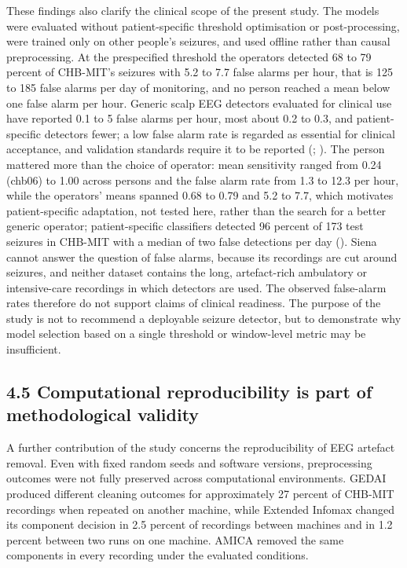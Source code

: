 \documentclass[11pt,a4paper]{article}
\begin{document}
These findings also clarify the clinical scope of the present study. The models were
evaluated without patient-specific threshold optimisation or post-processing, were
trained only on other people's seizures, and used offline rather than causal
preprocessing. At the prespecified threshold the operators detected 68 to 79 percent of
CHB-MIT's seizures with 5.2 to 7.7 false alarms per hour, that is 125 to 185 false alarms
per day of monitoring, and no person reached a mean below one false alarm per hour.
Generic scalp EEG detectors evaluated for clinical use have reported 0.1 to 5 false alarms
per hour, most about 0.2 to 0.3, and patient-specific detectors fewer; a low false alarm
rate is regarded as essential for clinical acceptance, and validation standards require
it to be reported (\citealp{Baumgartner_2018}; \citealp{Beniczky_2018}). The person
mattered more than the choice of operator: mean sensitivity ranged from 0.24 (chb06) to
1.00 across persons and the false alarm rate from 1.3 to 12.3 per hour, while the
operators' means spanned 0.68 to 0.79 and 5.2 to 7.7, which motivates patient-specific adaptation, not tested here, rather than the search for a better generic operator; patient-specific classifiers
detected 96 percent of 173 test seizures in CHB-MIT with a median of two false detections per
day (\citealp{Shoeb_2010}). Siena cannot answer the question of false alarms, because
its recordings are cut around seizures, and neither dataset contains the long,
artefact-rich ambulatory or intensive-care recordings in which detectors are used. The
observed false-alarm rates therefore do not support claims of clinical readiness. The
purpose of the study is not to recommend a deployable seizure detector, but to
demonstrate why model selection based on a single threshold or window-level metric may
be insufficient.

\subsection{4.5 Computational reproducibility is part of methodological validity}\label{computational-reproducibility-is-part-of-methodological-validity}

A further contribution of the study concerns the reproducibility of EEG artefact
removal. Even with fixed random seeds and software versions, preprocessing outcomes were
not fully preserved across computational environments. GEDAI produced different cleaning
outcomes for approximately 27 percent of CHB-MIT recordings when repeated on another
machine, while Extended Infomax changed its component decision in 2.5 percent of
recordings between machines and in 1.2 percent between two runs on one machine. AMICA
removed the same components in every recording under the evaluated conditions.
\end{document}
